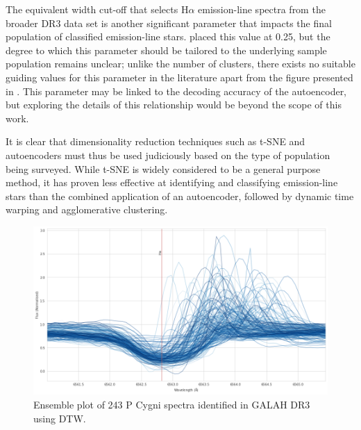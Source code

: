 The equivalent width cut-off that selects H$\alpha$ emission-line spectra from the broader DR3 data set is another significant parameter that impacts the final population of classified emission-line stars. \citet{vcotar2021galah} placed this value at 0.25, but the degree to which this parameter should be tailored to the underlying sample population remains unclear; unlike the number of clusters, there exists no suitable guiding values for this parameter in the literature apart from the figure presented in \citet{vcotar2021galah}. This parameter may be linked to the decoding accuracy of the autoencoder, but exploring the details of this relationship would be beyond the scope of this work.

It is clear that dimensionality reduction techniques such as t-SNE and autoencoders must thus be used judiciously based on the type of population being surveyed. While t-SNE is widely considered to be a general purpose method, it has proven less effective at identifying and classifying emission-line stars than the combined application of an autoencoder, followed by dynamic time warping and agglomerative clustering. 

\begin{figure}[!htb]
\centering
\includegraphics[scale=0.45]{figures/p cygni ensemble.png}
\caption{Ensemble plot of 243 P Cygni spectra identified in GALAH DR3 using DTW.}
\end{figure}

